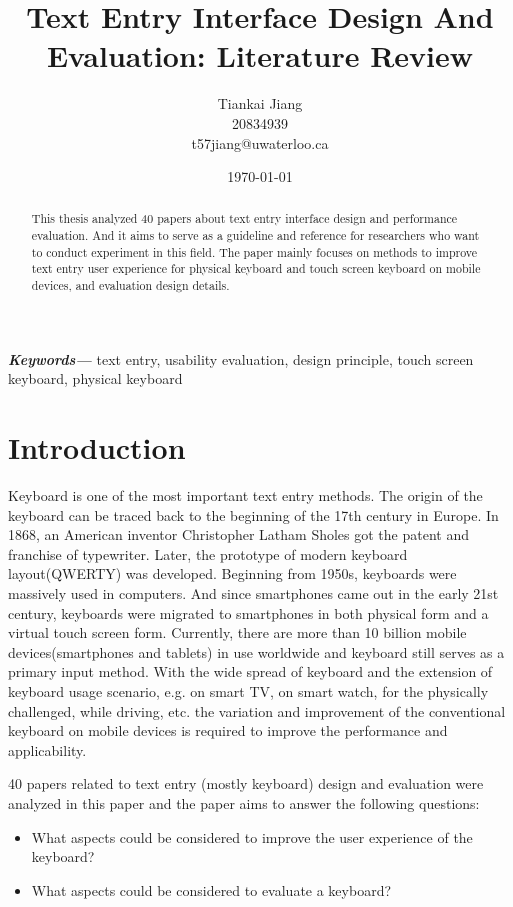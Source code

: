 \documentclass[11pt]{article}
\title{Text Entry Interface Design And Evaluation: Literature Review}
\author{Tiankai Jiang\\20834939\\t57jiang@uwaterloo.ca}
\date{\today}
\providecommand{\keywords}[1]
{
  \small    
  \textbf{\textit{Keywords---}} #1
}
\begin{document}
\maketitle

\begin{abstract}
This thesis analyzed 40 papers about text entry interface design and performance evaluation. And it aims to serve as a guideline and reference for researchers who want to conduct experiment in this field. The paper mainly focuses on methods to improve text entry user experience for physical keyboard and touch screen keyboard on mobile devices, and evaluation design details.
\end{abstract}

\keywords{text entry, usability evaluation, design principle, touch screen keyboard, physical keyboard}

\section{Introduction}\label{section-introduction}
Keyboard is one of the most important text entry methods. The origin of the keyboard can be traced back to the beginning of the 17th century in Europe. In 1868, an American inventor Christopher Latham Sholes got the patent and franchise of typewriter. Later, the prototype of modern keyboard layout(QWERTY) was developed. Beginning from 1950s, keyboards were massively used in computers. And since smartphones came out in the early 21st century, keyboards were migrated to smartphones in both physical form and a virtual touch screen form. Currently, there are more than 10 billion mobile devices(smartphones and tablets) in use worldwide and keyboard still serves as a primary input method. With the wide spread of keyboard and the extension of keyboard usage scenario, e.g. on smart TV, on smart watch, for the physically challenged, while driving, etc. the variation and improvement of the conventional keyboard on mobile devices is required to improve the performance and applicability.

40 papers related to text entry (mostly keyboard) design and evaluation were analyzed in this paper and the paper aims to answer the following questions:
\begin{itemize}
    \item What aspects could be considered to improve the user experience of the keyboard?
    \item What aspects could be considered to evaluate a keyboard?
\end{itemize}
\end{document}
